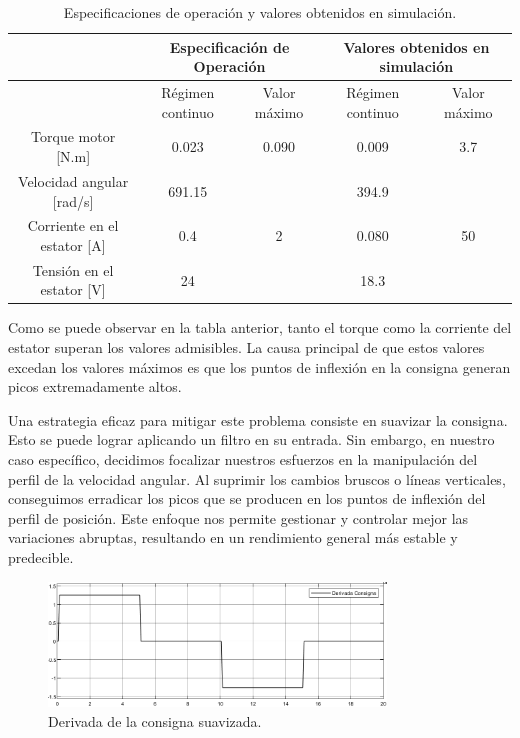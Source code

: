 \documentclass{article}
\begin{document}
\begin{table}[H]
    \begin{center}
    \begin{tabular}{|c|c|c|c|c|}
        \hline
         & \multicolumn{2}{c|}{Especificación de Operación} & \multicolumn{2}{c|}{Valores obtenidos en simulación} \\
        \hline
         & Régimen continuo & Valor máximo & Régimen continuo & Valor máximo \\
        \hline
        Torque motor [N.m] & 0.023 & 0.090 & 0.009 & 3.7 \\
        \hline
        Velocidad angular [rad/s] & 691.15 &  & 394.9 &  \\
        \hline
        Corriente en el estator [A] & 0.4 & 2 & 0.080 & 50 \\
        \hline
        Tensión en el estator [V] & 24 &  & 18.3 &\\
        \hline
    \end{tabular}
\end{center}
\caption{Especificaciones de operación y valores obtenidos en simulación.}
\end{table}

Como se puede observar en la tabla anterior, tanto el torque como la corriente del estator
superan los valores admisibles. La causa principal de que estos valores excedan los valores máximos 
es que los puntos de inflexión en la consigna generan picos extremadamente altos.

Una estrategia eficaz para mitigar este problema consiste en suavizar la consigna. Esto se puede lograr 
aplicando un filtro en su entrada. Sin embargo, en nuestro caso específico, decidimos focalizar nuestros 
esfuerzos en la manipulación del perfil de la velocidad angular. Al suprimir los cambios bruscos o líneas 
verticales, conseguimos erradicar los picos que se producen en los puntos de inflexión del perfil de 
posición. Este enfoque nos permite gestionar y controlar mejor las variaciones abruptas, resultando en 
un rendimiento general más estable y predecible.

\begin{figure}[H]
    \centering
    \includegraphics[width=0.8\textwidth]{5.2..5.1.a.1.png}
    \caption{Derivada de la consigna suavizada.}
\end{figure}
\end{document}
